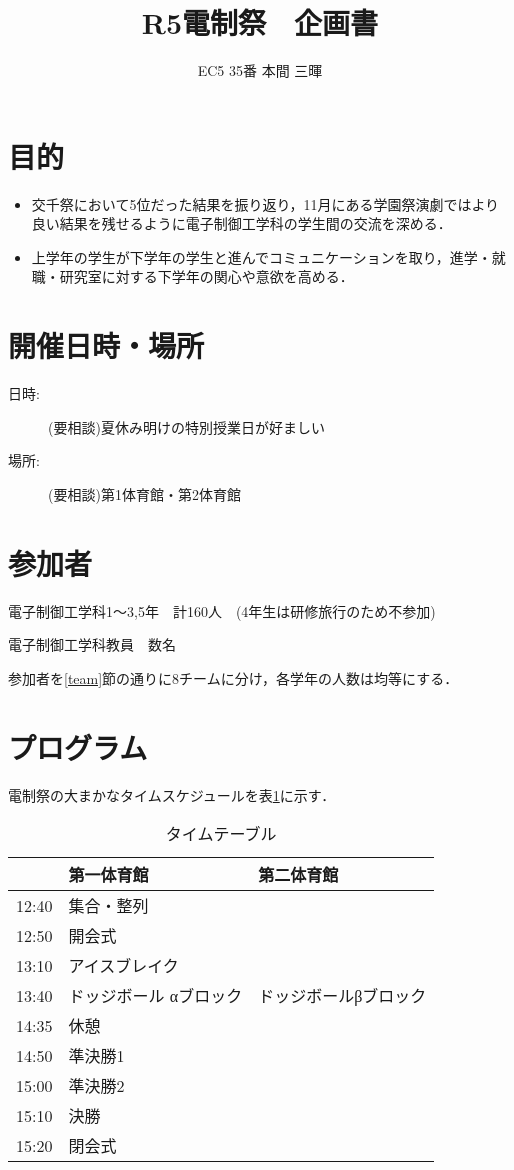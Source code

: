 \documentclass[dvipdfmx]{jsarticle}
\begin{document}
\title{R5電制祭　企画書}
\author{EC5 35番 本間 三暉}
\maketitle

\section{目的}
\begin{itemize}
  \item 交千祭において5位だった結果を振り返り，11月にある学園祭演劇ではより良い結果を残せるように電子制御工学科の学生間の交流を深める．
  \item 上学年の学生が下学年の学生と進んでコミュニケーションを取り，進学・就職・研究室に対する下学年の関心や意欲を高める．
\end{itemize}

\section{開催日時・場所}
\begin{description}
  \item[日時:] (要相談)夏休み明けの特別授業日が好ましい
  \item[場所:] (要相談)第1体育館・第2体育館
\end{description}
\section{参加者}
電子制御工学科1～3,5年　計160人　(4年生は研修旅行のため不参加)

電子制御工学科教員　数名


参加者を\ref{team}節の通りに8チームに分け，各学年の人数は均等にする．
\section{プログラム}
電制祭の大まかなタイムスケジュールを表\ref{time}に示す．
\begin{table}[H]

  \caption{タイムテーブル}
  \label{time}
  \centering
  \begin{tabular}{l||l|l}
          & 第一体育館        & 第二体育館       \\\hline\hline
    12:40 & 集合・整列        &             \\
    12:50 & 開会式          &             \\
    13:10 & アイスブレイク      &             \\
    13:40 & ドッジボール αブロック & ドッジボールβブロック \\
    14:35 & 休憩           &             \\
    14:50 & 準決勝1         &             \\
    15:00 & 準決勝2         &             \\
    15:10 & 決勝           &             \\
    15:20 & 閉会式          &
  \end{tabular}
\end{table}
\end{document}

